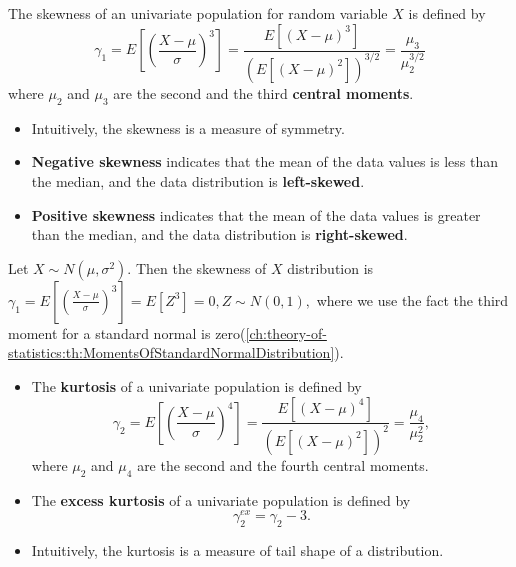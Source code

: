 \begin{refsection}
\begin{definition}[skewness]
	The skewness of an univariate population for random variable $X$ is defined by 
	$$\gamma_1 = E[(\frac{X-\mu}{\sigma})^3] = \frac{E[(X-\mu)^3]}{(E[(X-\mu)^2])^{3/2}}=\frac{\mu_3}{\mu_2^{3/2}} $$
	where $\mu_2$ and $\mu_3$ are the second and the third \textbf{central moments}. 
\end{definition}

\begin{remark}[interpretation]\hfill
	\begin{itemize}
		\item Intuitively, the skewness is a measure of symmetry. 
		\item \textbf{Negative skewness} indicates that the mean of the data values is less than the median, and the data distribution is \textbf{left-skewed}.
		\item \textbf{Positive skewness} indicates that the mean of the data values is greater than the median, and the data distribution is \textbf{right-skewed}.
	\end{itemize}
\end{remark}

\begin{example}
Let $X\sim N(\mu,\sigma^2)$. Then the skewness of $X$ distribution is
$\gamma_1 = E[(\frac{X-\mu}{\sigma})^3] = E[Z^3] = 0, Z\sim N(0,1),$
where we use the fact the third moment for a standard normal is zero(\autoref{ch:theory-of-statistics:th:MomentsOfStandardNormalDistribution}). 	
\end{example}

\begin{definition}\hfill
\begin{itemize}
	\item 	The \textbf{kurtosis} of a univariate population is defined by 
	$$\gamma_2 = E[(\frac{X-\mu}{\sigma})^4] = \frac{E[(X-\mu)^4]}{(E[(X-\mu)^2])^{2}} = \frac{\mu_4}{\mu_2^2},$$
	where $\mu_2$ and $\mu_4$ are the second and the fourth central moments. 
	\item 	The \textbf{excess kurtosis} of a univariate population is defined by 
	$$\gamma_2^{ex} = \gamma_2 - 3.$$
\end{itemize}	
\end{definition}

\begin{remark}[interpretation]\hfill
	\begin{itemize}
		\item Intuitively, the kurtosis is a measure of tail shape of a distribution.
	\end{itemize}
\end{remark}





\end{refsection}
